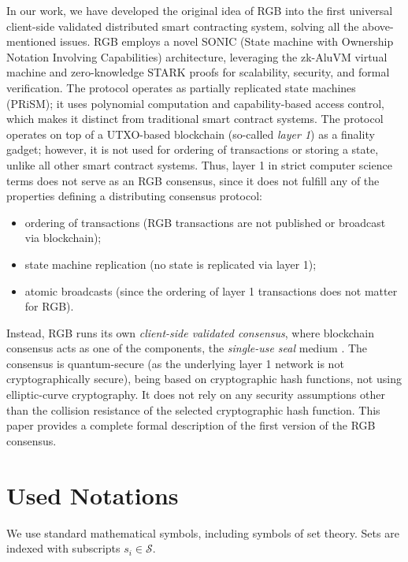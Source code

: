 \documentclass[9pt,oneside]{amsart}
\begin{document}
\begin{multicols}{2}
In our work, we have developed the original idea of RGB into the first universal
client-side validated distributed smart contracting system,
solving all the above-mentioned issues.
RGB employs a novel SONIC (State machine with Ownership Notation Involving Capabilities) architecture,
leveraging the zk-AluVM virtual machine and zero-knowledge STARK proofs
for scalability, security, and formal verification.
The protocol operates as partially replicated state machines (PRiSM);
it uses polynomial computation and capability-based access control,
which makes it distinct from traditional smart contract systems.
The protocol operates on top of a UTXO-based blockchain (so-called \emph{layer 1})
as a finality gadget; however, it is not used for ordering of transactions or storing a state,
unlike all other smart contract systems.
Thus, layer 1 in strict computer science terms does not serve as an RGB consensus,
since it does not fulfill any of the properties defining a distributing consensus protocol:

\begin{itemize}
    \item ordering of transactions (RGB transactions are not published or broadcast via blockchain);
    \item state machine replication (no state is replicated via layer 1);
    \item atomic broadcasts (since the ordering of layer 1 transactions does not matter for RGB).
\end{itemize}

Instead, RGB runs its own \emph{client-side validated consensus}, where blockchain consensus
acts as one of the components, the \emph{single-use seal} medium \cite{LNPBP8}.
The consensus is quantum-secure (as the underlying layer 1 network is not cryptographically secure),
being based on cryptographic hash functions, not using elliptic-curve cryptography.
It does not rely on any security assumptions other than the collision resistance of the selected
cryptographic hash function.
This paper provides a complete formal description of the first version of the RGB consensus.

\section{Used Notations}

We use standard mathematical symbols, including symbols of set theory.
Sets are indexed with subscripts $s_i \in \mathcal{S}$.


\end{multicols}
\end{document}
